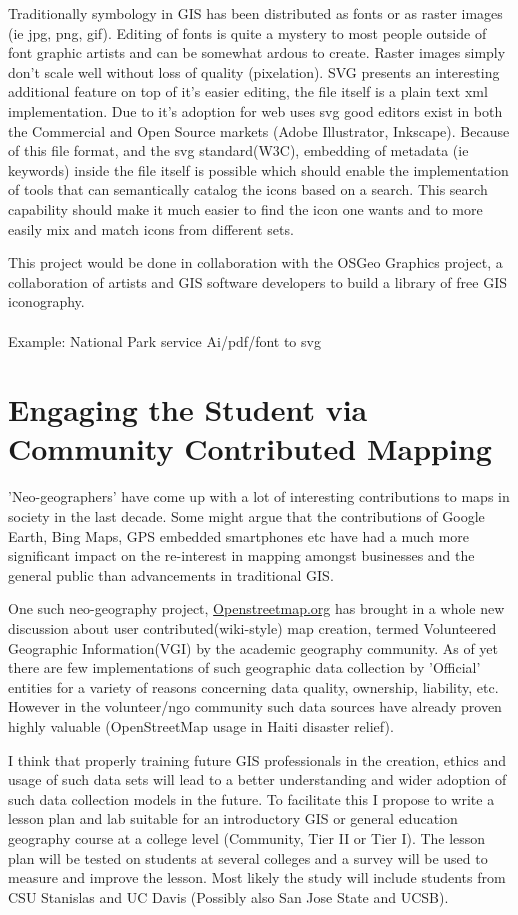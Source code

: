 \documentclass[12pt,letterpaper]{article}
\begin{document}
Traditionally symbology in GIS has been distributed as fonts or as raster images (ie jpg, png, gif). Editing of fonts is quite a mystery to most people outside of font graphic artists and can be somewhat ardous to create. Raster images simply don't scale well without loss of quality (pixelation). SVG presents an interesting additional feature on top of it's easier editing, the file itself is a plain text xml implementation. Due to it's adoption for web uses svg good editors exist in both the Commercial and Open Source markets (Adobe Illustrator, Inkscape). Because of this file format, and the svg standard(W3C), embedding of metadata (ie keywords) inside the file itself is possible which should enable the implementation of tools that can semantically catalog the icons based on a search. This search capability should make it much easier to find the icon one wants and to more easily mix and match icons from different sets.

This project would be done in collaboration with the OSGeo Graphics project, a collaboration of artists and GIS software developers to build a library of free GIS iconography.
\\
\\ Example: National Park service Ai/pdf/font to svg

\section{Engaging the Student via Community Contributed Mapping}
'Neo-geographers' have come up with a lot of interesting contributions to maps in society in the last decade. Some might argue that the contributions of Google Earth, Bing Maps, GPS embedded smartphones etc have had a much more significant impact on the re-interest in mapping amongst businesses and the general public than advancements in traditional GIS.

One such neo-geography project, \href{http://openstreetmap.org}{Openstreetmap.org} has brought in a whole new discussion about user contributed(wiki-style) map creation, termed Volunteered Geographic Information(VGI) by the academic geography community. As of yet there are few implementations of such geographic data collection by 'Official' entities for a variety of reasons concerning data quality, ownership, liability, etc. However in the volunteer/ngo community such data sources have already proven highly valuable (OpenStreetMap usage in Haiti disaster relief).

I think that properly training future GIS professionals in the creation, ethics and usage of such data sets will lead to a better understanding and wider adoption of such data collection models in the future. To facilitate this I propose to write a lesson plan and lab suitable for an introductory GIS or general education geography course at a college level (Community, Tier II or Tier I). The lesson plan will be tested on students at several colleges and a survey will be used to measure and improve the lesson. Most likely the study will include students from CSU Stanislas and UC Davis (Possibly also San Jose State and UCSB).
\end{document}

